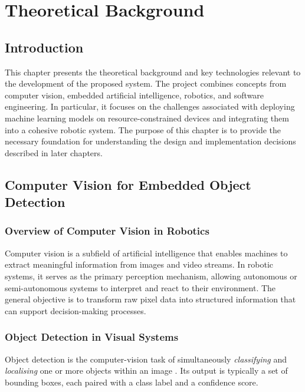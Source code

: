 

\chapter{Theoretical Background}

\section{Introduction}
This chapter presents the theoretical background and key technologies relevant to the development of the proposed system. The project combines concepts from computer vision, embedded artificial intelligence, robotics, and software engineering. In particular, it focuses on the challenges associated with deploying machine learning models on resource-constrained devices and integrating them into a cohesive robotic system. The purpose of this chapter is to provide the necessary foundation for understanding the design and implementation decisions described in later chapters.

\section{Computer Vision for Embedded Object Detection}

\subsection{Overview of Computer Vision in Robotics}

Computer vision is a subfield of artificial intelligence that enables machines to extract meaningful information from images and video streams. In robotic systems, it serves as the primary perception mechanism, allowing autonomous or semi-autonomous systems to interpret and react to their environment. The general objective is to transform raw pixel data into structured information that can support decision-making processes.

\subsection{Object Detection in Visual Systems}

Object detection is the computer-vision task of simultaneously
\emph{classifying} and \emph{localising} one or more objects within an
image \cite{zou2023object}  . Its output is typically a set of bounding
boxes, each paired with a class label and a confidence score.

